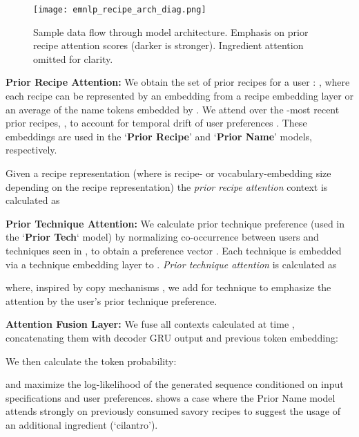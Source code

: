 \documentclass[11pt,a4paper]{article}
\begin{document}
\begin{figure}[t]
  \centering
  \texttt{[image: emnlp\_recipe\_arch\_diag.png]}
  \caption{Sample data flow through model architecture. Emphasis on prior recipe attention scores (darker is stronger). Ingredient attention omitted for clarity.}
  \label{fig:ex}
\end{figure}

\noindent
\textbf{Prior Recipe Attention:}
We obtain the set of prior recipes for a user : , where each recipe can be represented by an embedding from a recipe embedding layer  or an average of the name tokens embedded by .
We attend over the -most recent prior recipes, ,  to account for temporal drift of user preferences \cite{DBLP:conf/ismir/MooreCTJ13}.
These embeddings are used in the `\textbf{Prior Recipe}' and `\textbf{Prior Name}' models, respectively.

Given a recipe representation  (where  is recipe- or vocabulary-embedding size depending on the recipe representation) the \textit{prior recipe attention} context  is calculated as


\noindent
\textbf{Prior Technique Attention:}
We calculate prior technique preference (used in the `\textbf{Prior Tech}` model) by normalizing co-occurrence between users and techniques seen in , to obtain a preference vector .
Each technique  is embedded via a technique embedding layer  to .
\textit{Prior technique attention} is calculated as

where, inspired by copy mechanisms \cite{see2017get, DBLP:conf/acl/GuLLL16}, we add  for technique  to emphasize the attention by the user's prior technique preference.

\noindent
\textbf{Attention Fusion Layer:}
We fuse all contexts calculated at time , concatenating them with decoder GRU output and previous token embedding:

We then calculate the token probability:

and maximize the log-likelihood of the generated sequence conditioned on input specifications and user preferences.
 shows a case where the Prior Name model attends strongly on previously consumed savory recipes to suggest the usage of an additional ingredient (`cilantro').
\end{document}
